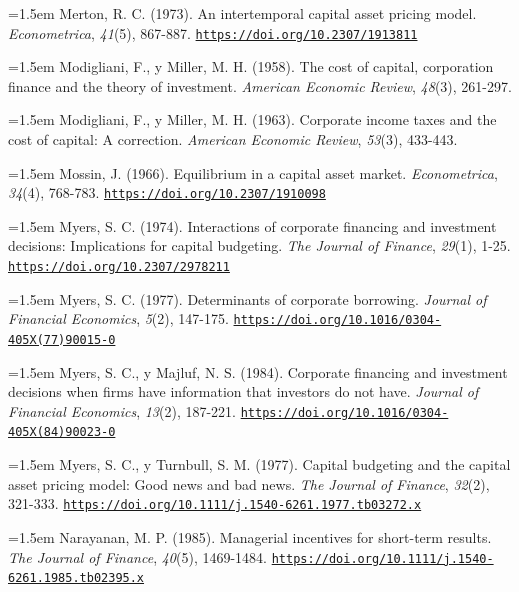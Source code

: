 \documentclass[10pt,a4paper]{article}
\begin{document}
\noindent\hangindent=1.5em Merton, R. C. (1973). An intertemporal capital asset pricing model. \textit{Econometrica}, \textit{41}(5), 867-887. \href{https://doi.org/10.2307/1913811}{\nolinkurl{https://doi.org/10.2307/1913811}}

\noindent\hangindent=1.5em Modigliani, F., y Miller, M. H. (1958). The cost of capital, corporation finance and the theory of investment. \textit{American Economic Review}, \textit{48}(3), 261-297.

\noindent\hangindent=1.5em Modigliani, F., y Miller, M. H. (1963). Corporate income taxes and the cost of capital: A correction. \textit{American Economic Review}, \textit{53}(3), 433-443.

\noindent\hangindent=1.5em Mossin, J. (1966). Equilibrium in a capital asset market. \textit{Econometrica}, \textit{34}(4), 768-783. \href{https://doi.org/10.2307/1910098}{\nolinkurl{https://doi.org/10.2307/1910098}}

\noindent\hangindent=1.5em Myers, S. C. (1974). Interactions of corporate financing and investment decisions: Implications for capital budgeting. \textit{The Journal of Finance}, \textit{29}(1), 1-25. \href{https://doi.org/10.2307/2978211}{\nolinkurl{https://doi.org/10.2307/2978211}}

\noindent\hangindent=1.5em Myers, S. C. (1977). Determinants of corporate borrowing. \textit{Journal of Financial Economics}, \textit{5}(2), 147-175. \href{https://doi.org/10.1016/0304-405X(77)90015-0}{\nolinkurl{https://doi.org/10.1016/0304-405X(77)90015-0}}

\noindent\hangindent=1.5em Myers, S. C., y Majluf, N. S. (1984). Corporate financing and investment decisions when firms have information that investors do not have. \textit{Journal of Financial Economics}, \textit{13}(2), 187-221. \href{https://doi.org/10.1016/0304-405X(84)90023-0}{\nolinkurl{https://doi.org/10.1016/0304-405X(84)90023-0}}

\noindent\hangindent=1.5em Myers, S. C., y Turnbull, S. M. (1977). Capital budgeting and the capital asset pricing model: Good news and bad news. \textit{The Journal of Finance}, \textit{32}(2), 321-333. \href{https://doi.org/10.1111/j.1540-6261.1977.tb03272.x}{\nolinkurl{https://doi.org/10.1111/j.1540-6261.1977.tb03272.x}}

\noindent\hangindent=1.5em Narayanan, M. P. (1985). Managerial incentives for short-term results. \textit{The Journal of Finance}, \textit{40}(5), 1469-1484. \href{https://doi.org/10.1111/j.1540-6261.1985.tb02395.x}{\nolinkurl{https://doi.org/10.1111/j.1540-6261.1985.tb02395.x}}
\end{document}
